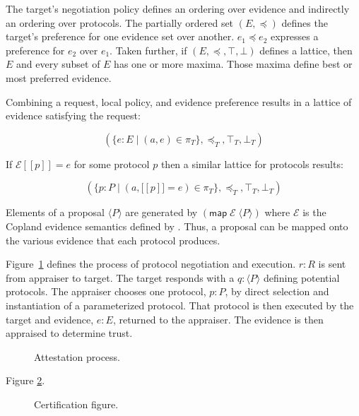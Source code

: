\documentclass[sigconf,authordraft]{acmart}
\begin{document}
The target's negotiation policy defines an ordering over evidence and
indirectly an ordering over protocols.  The partially ordered set
$(E,\preceq)$ defines the target's preference for one evidence set
over another. $e_1\preceq e_2$ expresses a preference for $e_2$ over
$e_1$.  Taken further, if $(E,\preceq,\top,\bot)$ defines a lattice,
then $E$ and every subset of $E$ has one or more maxima.  Those maxima
define best or most preferred evidence.

Combining a request, local policy, and evidence preference results in
a lattice of evidence satisfying the request:

\[(\{e:E\mid (a,e)\in\pi_T\},\preceq_T,\top_T,\bot_T)\]

If $\mathcal{E}[\![p]\!]=e$ for some protocol $p$ then a similar
lattice for protocols results:

\[(\{p:P\mid (a,\mathcal[\![p]\!]=e)\in\pi_T\},\preceq_T,\top_T,\bot_T)\]


Elements of a proposal $\langle P\rangle$ are generated by
$(\mathsf{map}\; \mathcal{E}\; \langle P\rangle)$ where $\mathcal{E}$
is the Copland evidence semantics defined by \citet{Ramsdell:2019aa}.
Thus, a proposal can be mapped onto the various evidence that each
protocol produces.

Figure~\ref{fig:sequence-fig} defines the process of protocol
negotiation and execution.  $r:R$ is sent from appraiser to
target.  The target responds with a $q:\langle P\rangle$  defining potential
protocols.  The appraiser chooses one protocol, $p:P$, by direct selection and
instantiation of a parameterized protocol.  That protocol is then
executed by the target and evidence, $e:E$, returned to the appraiser.  The
evidence is then appraised to determine trust.

\begin{figure}[hbtp]
  \centering
  
  \caption[Attestation process]{Attestation process.}
  \label{fig:sequence-fig}
\end{figure}

Figure \ref{fig:certification-fig}.

\begin{figure}[hbtp]
  \centering
  
  \caption[Attestation process]{Certification figure.}
  \label{fig:certification-fig}
\end{figure}
\end{document}
